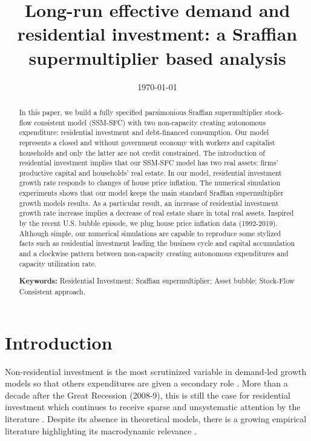 \documentclass[12pt]{article}
\date{\today}
\title{Long-run effective demand and residential investment: a Sraffian supermultiplier based analysis}
\begin{document}
\maketitle
\begin{abstract}
In this paper, we build a fully specified parsimonious Sraffian supermultiplier stock-flow consistent model (SSM-SFC) with two non-capacity creating autonomous expenditure: residential investment and debt-financed consumption.
Our model represents a closed and without government economy with workers and capitalist households and only the latter are not credit constrained.
The introduction of residential investment implies that our SSM-SFC model has two real assets: firms' productive capital and households' real estate.
In our model, residential investment growth rate responds to changes of house price inflation.
The numerical simulation experiments shows that our model keeps the main standard Sraffian supermultiplier growth models results.
As a particular result, an increase of residential investment growth rate increase implies a decrease of real estate share in total real assets.
Inspired by the recent U.S. bubble episode, we plug house price inflation data (1992-2019).
Although simple, our numerical simulations are capable to reproduce some stylized facts such as residential investment leading the business cycle and capital accumulation and a clockwise pattern between non-capacity creating autonomous expenditures and capacity utilization rate.

\noindent \textbf{Keywords:} Residential Investment; Sraffian supermultiplier; Asset bubble;  Stock-Flow Consistent approach.
\end{abstract}

\doublespacing
\setlength{\parindent}{4em}
\setlength{\parskip}{1em}

\section{Introduction}
\label{sec:org7990468}
\label{sec:introduction}
Non-residential investment is the most scrutinized variable in demand-led growth models so that others expenditures are given a secondary role \cite{brochier_macroeconomics_2017}.
More than a decade after the Great Recession (2008-9), this is still the case for residential investment which continues to receive sparse and unsystematic attention by the literature \cites{caverzasi_stock-flow_2013}{nikolaidi_minsky_2017}.
Despite its absence in theoretical models, there is a growing empirical literature highlighting its macrodynamic relevance \cites{leamer_housing_2007}{jorda_great_2016}{fiebiger_semi-autonomous_2018}{fiebiger_trend_2017}.
\end{document}
